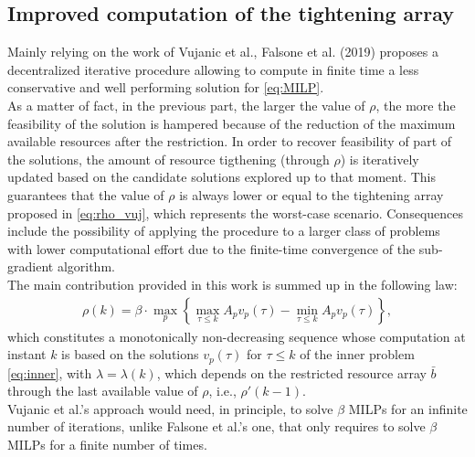 \subsection{Improved computation of the tightening array}
Mainly relying on the work of Vujanic et al., Falsone et al. (2019)\supercite{falsone} proposes a decentralized iterative procedure allowing to compute in finite time a less conservative and well performing solution for \ref{eq:MILP}.\\
As a matter of fact, in the previous part, the larger the value of $\rho$, the more the feasibility of the solution is hampered because of the reduction of the maximum available resources after the restriction. In order to recover feasibility of part of the solutions, the amount of resource tigthening (through $\rho$) is iteratively updated based on the candidate solutions explored up to that moment. This guarantees that the value of $\rho$ is always lower or equal to the tightening array proposed in \ref{eq:rho_vuj}, which represents the worst-case scenario. Consequences include the possibility of applying the procedure to a larger class of problems with lower computational effort due to the finite-time convergence of the sub-gradient algorithm.\\
The main contribution provided in this work is summed up in the following law:
\begin{align*}
    \rho(k) = \beta \cdot \max_{p} \left\{ \max_{\tau \leq k} A_p v_p(\tau) - \min_{\tau \leq k} A_p v_p(\tau) \right\},
\end{align*}
which constitutes a monotonically non-decreasing sequence whose computation at instant $k$ is based on the solutions $v_p(\tau)$ for $\tau \leq k$ of the inner problem \ref{eq:inner}, with $\lambda = \lambda(k)$, which depends on the restricted resource array $\bar{b}$ through the last available value of $\rho$, i.e., $\rho'(k-1)$. \\ Vujanic et al.'s approach would need, in principle, to solve $\beta$ MILPs for an infinite number of iterations, unlike Falsone et al.'s one, that only requires to solve $\beta$ MILPs for a finite number of times.

